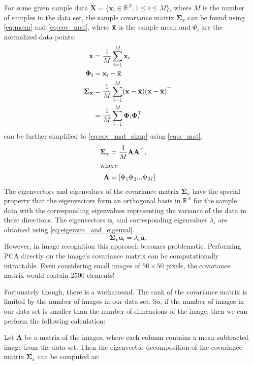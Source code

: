 \documentclass[headings=optiontoheadandtoc,listof=totoc,parskip=full]{scrartcl}
\def \reals {\mathbb{R}}
\begin{document}
For some given sample data $\mathbf{X} = \{\mathbf{x}_i \in \reals^N, 1 \leq i \leq M\}$, where $M$ is the number of samples in the data set, the sample covariance matrix $\mathbf{\Sigma}_x$ can be found using \cref{eq:mean} and \cref{eq:cov_mat}, where $\mathbf{\Bar{x}}$ is the sample mean and $\Phi_i$ are the normalized data points:
%
\begin{align} 
    \mathbf{\Bar{x}} &= \frac{1}{M}\sum_{i = 1}^{M}\mathbf{x}_i \label{eq:mean}\\
    \mathbf{\Phi_i} &= \mathbf{x}_i - \mathbf{\Bar{x}}\\
    \mathbf{\Sigma_x} &= \frac{1}{M}\sum_{i = 1}^M(\mathbf{x} - \mathbf{\Bar{x}})(\mathbf{x} - \mathbf{\Bar{x}})^\top \nonumber\\
        &= \frac{1}{M}\sum_{i = 1}^{M}\mathbf{\Phi}_i\mathbf{\Phi}_i^\top \label{eq:cov_mat}
\end{align}
%
 can be further simplified to \cref{eq:cov_mat_simp} using \cref{eq:a_mat}.
%
\begin{align}
    \mathbf{\Sigma_x} &= \frac{1}{M}\mathbf{A}\mathbf{A}^\top, \label{eq:cov_mat_simp}\\
    \intertext{where}
    \mathbf{A} &= [\Phi_1 \Phi_2 ... \Phi_M] \label{eq:a_mat}
\end{align}
%
The eigenvectors and eigenvalues of the covariance matrix $\mathbf{\Sigma}_x$ have the special property that the eigenvectors form an orthogonal basis in $\reals^N$ for the sample data with the corresponding eigenvalues representing the variance of the data in these directions. The eigenvectors $\mathbf{u}_i$ and corresponding eigenvalues $\lambda_i$ are obtained using \cref{eq:eigenvec_and_eigenval}.
%
\begin{equation}\label{eq:eigenvec_and_eigenval}
    \mathbf{\Sigma_x}\mathbf{u_i} = \lambda_i\mathbf{u}_i
\end{equation}
%
However, in image recognition this approach becomes problematic. Performing PCA directly on the image's covariance matrix can be computationally intractable. Even considering small images of $50 \times 50$ pixels, the covariance matrix would contain $2500$ elements!

Fortunately though, there is a workaround. The rank of the covariance matrix is limited by the number of images in our data-set. So, if the number of images in our data-set is smaller than the number of dimensions of the image, then we can perform the following calculation:

Let $\mathbf{A}$ be a matrix of the images, where each column contains a mean-subtracted image from the data-set. Then the eigenvector decomposition of the covariance matrix $\mathbf{\Sigma}_x$  can be computed as:
\end{document}
